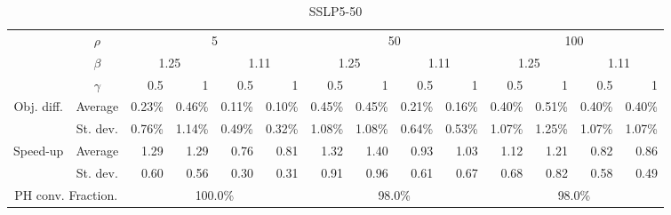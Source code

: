 \documentclass[preprint, 1p, review]{elsarticle}
\begin{document}
 \begin{table}[htbp]
   \centering
   \tiny
     \begin{tabular}{ccrrrrrrrrrrrr}
     \toprule
\multirow{3}[6]{*}{} & $\rho$ & \multicolumn{4}{c}{5} & \multicolumn{4}{c}{50} & \multicolumn{4}{c}{100} \\
     
        & $\beta$ & \multicolumn{2}{c}{1.25} & \multicolumn{2}{c}{1.11} & \multicolumn{2}{c}{1.25} & \multicolumn{2}{c}{1.11} & \multicolumn{2}{c}{1.25} & \multicolumn{2}{c}{1.11} \\
        & $\gamma$ & 0.5 & 1  & 0.5 & 1  & 0.5 & 1  & 0.5 & 1  & 0.5 & 1  & 0.5 & 1 \\   \midrule
     \multirow{2}[4]{*}{Obj. diff.} & Average & 0.23\% & 0.46\% & 0.11\% & 0.10\% & 0.45\% & 0.45\% & 0.21\% & 0.16\% & 0.40\% & 0.51\% & 0.40\% & 0.40\% \\
        & St. dev. & 0.76\% & 1.14\% & 0.49\% & 0.32\% & 1.08\% & 1.08\% & 0.64\% & 0.53\% & 1.07\% & 1.25\% & 1.07\% & 1.07\% \\
     \multirow{2}[4]{*}{Speed-up} & Average & 1.29 & 1.29 & 0.76 & 0.81 & 1.32 & 1.40 & 0.93 & 1.03 & 1.12 & 1.21 & 0.82 & 0.86 \\
        & St. dev. & 0.60 & 0.56 & 0.30 & 0.31 & 0.91 & 0.96 & 0.61 & 0.67 & 0.68 & 0.82 & 0.58 & 0.49 \\
     \multicolumn{2}{c}{PH conv. Fraction.} & \multicolumn{4}{c}{100.0\%} & \multicolumn{4}{c}{98.0\%} & \multicolumn{4}{c}{98.0\%} \\
     \bottomrule
     \end{tabular}%
     \caption{SSLP5-50}
   \label{tab:App5}%
 \end{table}%
     
\end{document}
